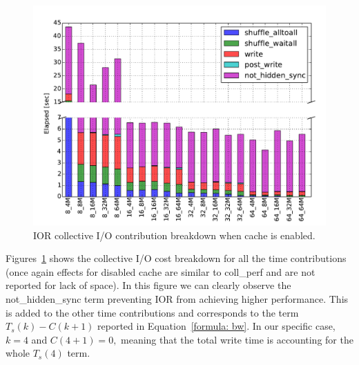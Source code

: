\begin{figure}[htb]
  \centering
  \includegraphics[width=0.9\columnwidth]{figures/ior_32GB_30sec_enable}
  \caption{IOR collective I/O contribution breakdown when cache is enabled.}
  \label{figure: ior-elaps-enable}
\end{figure}

Figures~\ref{figure: ior-elaps-enable} shows the collective I/O cost breakdown for all the time contributions (once again effects for disabled cache are similar to coll\_perf and are not reported for lack of space). In this figure we can clearly observe the not\_hidden\_sync term preventing IOR from achieving higher performance. This is added to the other time contributions and corresponds to the term $T_s(k)-C(k+1)$ reported in Equation~\ref{formula: bw}. In our specific case, $k = 4$ and $C(4+1) = 0,$ meaning that the total write time is accounting for the whole $T_s(4)$ term.

